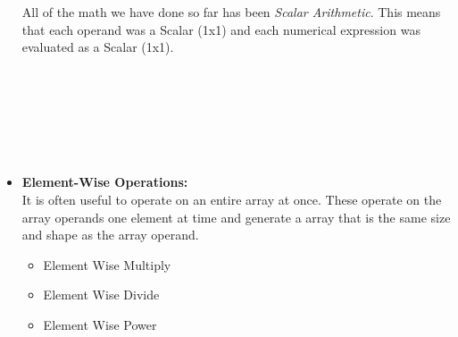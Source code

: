 \documentclass[11pt]{article}
\newcommand{\PR}{\color{mypurple}}
\begin{document}
\begin{itemize}
	All of the math we have done so far has been {\it Scalar Arithmetic}. This means that each operand was a Scalar (1x1) and each numerical expression was evaluated as a Scalar (1x1). \\
	
	  \\\\
	   \\
	  
	   \\\\
	   \\
		
	
	\item \textbf{ \LARGE {\PR Element-Wise} Operations:}\\
	
	It is often useful to operate on an entire array at once. These operate on the array operands one element at time and generate a array that is the same size and shape as the array operand.
	\begin{itemize}
		\item Element Wise Multiply  \\
		\item Element Wise Divide  \\
		\item Element Wise Power  \\
		
			 \\\\
			 \\\\
			 \\\\
			 \\\\
	\end{itemize}
		
\end{itemize}


	
\end{document}
